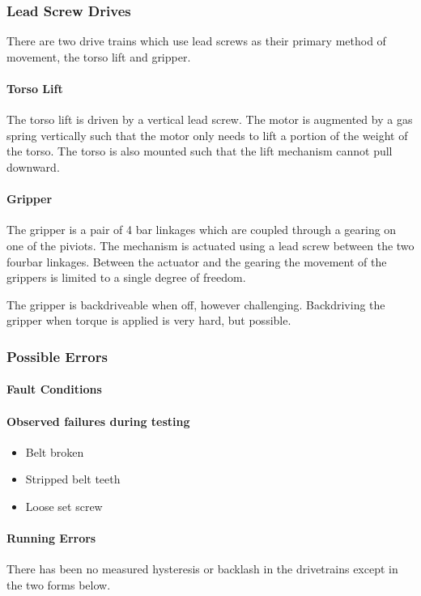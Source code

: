 \subsubsection{Lead Screw Drives}
There are two drive trains which use lead screws as their primary
method of movement, the torso lift and gripper.  

\paragraph{Torso Lift }
The torso lift is driven by a vertical lead screw.  The motor is
augmented by a gas spring vertically such that the motor only needs to
lift a portion of the weight of the torso.  The torso is also mounted
such that the lift mechanism cannot pull downward.  

\paragraph{Gripper }
The gripper is a pair of 4 bar linkages which are coupled through a
gearing on one of the piviots.  The mechanism is actuated using a lead
screw between the two fourbar linkages. Between the actuator and the
gearing the movement of the grippers is limited to a single degree of
freedom.

The gripper is backdriveable when off, however challenging.
Backdriving the gripper when torque is applied is very hard, but
possible.

\subsubsection{Possible Errors}
\paragraph{Fault Conditions}
\paragraph{Observed failures during testing}
\begin{itemize}
\item Belt broken 
\item Stripped belt teeth
\item Loose set screw
\end{itemize}
\paragraph{Running Errors}
There has been no measured hysteresis or backlash in the drivetrains
except in the two forms below.  

